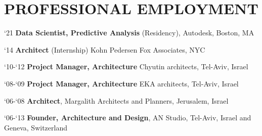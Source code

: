 \section*{PROFESSIONAL EMPLOYMENT}

\begin{tablist}


   \item[`21]\tab\textbf{Data Scientist, Predictive Analysis} (Residency),
   Autodesk, Boston, MA


   \item[`14]\tab\textbf{Architect} (Internship)
   Kohn Pedersen Fox Associates, NYC

   \item[`10-`12]\tab
   \textbf{Project Manager, Architecture} Chyutin architects, Tel-Aviv, Israel

   \item[`08-`09]\tab\textbf{Project Manager, Architecture}
   EKA architects, Tel-Aviv, Israel

   \item[`06-`08]\tab\textbf{Architect},
   Margalith Architects and Planners, Jerusalem, Israel

   \item[`06-`13]\tab
   \textbf{Founder, Architecture and Design},
   AN Studio, Tel-Aviv, Israel and Geneva, Switzerland
\end{tablist}
